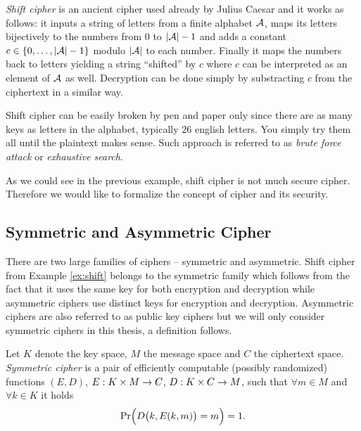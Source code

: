 \begin{example}
\label{ex:shift}
	{\em Shift cipher} is an ancient cipher used already by Julius Caesar and it works as follows: it inputs a string of letters from a finite alphabet $\cal A$, maps its letters bijectively to the numbers from $0$ to $|{\cal A}|-1$ and adds a constant $c\in\{0 , \ldots , |{\cal A}|-1\}$ modulo $|\cal A|$ to each number. Finally it maps the numbers back to letters yielding a string ``shifted'' by $c$ where $c$ can be interpreted as an element of $\cal A$ as well. Decryption can be done simply by substracting $c$ from the ciphertext in a similar way.
	
	Shift cipher can be easily broken by pen and paper only since there are as many keys as letters in the alphabet, typically $26$ english letters. You simply try them all until the plaintext makes sense. Such approach is referred to as {\em brute force attack} or {\em exhaustive search}.
\end{example}

As we could see in the previous example, shift cipher is not much secure cipher. Therefore we would like to formalize the concept of cipher and its security.


\subsection{Symmetric and Asymmetric Cipher}

There are two large families of ciphers -- symmetric and asymmetric. Shift cipher from Example \ref{ex:shift} belongs to the symmetric family which follows from the fact that it uses the same key for both encryption and decryption while asymmetric ciphers use distinct keys for encryption and decryption. Asymmetric ciphers are also referred to as public key ciphers but we will only consider symmetric ciphers in this thesis, a definition follows.

\begin{defn}
\label{def:symcipher}
	Let $K$ denote the key space, $M$ the message space and $C$ the ciphertext space. {\em Symmetric cipher} is a pair of efficiently computable (possibly randomized) functions $(E,D)$, $E:K\times M\rightarrow C$, $D:K\times C\rightarrow M$, such that $\forall m\in M$ and $\forall k\in K$ it holds
	\begin{equation}
		\Pr\Bigl(D\bigl(k,E(k,m)\bigr)=m\Bigr) = 1 . \label{eq:correct}
	\end{equation}
\end{defn}

